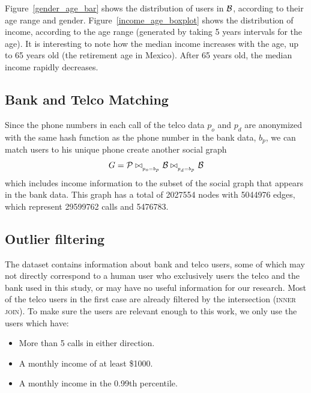 Figure~\ref{gender_age_bar} shows the distribution of users in $\mathcal{B}$, according to
their age range and gender.
Figure~\ref{income_age_boxplot} shows the distribution of income, according to the age range (generated by taking 5 years intervals for the age).
It is interesting to note how the median income increases with the age, up to 65 years old (the retirement age in Mexico). After 65 years old, the median income rapidly decreases.


\subsection{Bank and Telco Matching}

Since the phone numbers in each call of the telco data $ p_o $ and $ p_d $ are anonymized with the same hash function as the phone number in the bank data, $ b_p $, we can match users to his unique phone create another social graph 
$$ G = \mathcal{P} \bowtie_{_{p_o = b_p}} \mathcal{B} \bowtie_{_{p_d = b_p}} \mathcal{B} $$ 
which includes income information to the subset of the social graph that appears in the bank data.
This graph has a total of \num{2027554} nodes with \num{5044976} edges, which represent \num{29599762} calls and \num{5476783}.

\subsection{Outlier filtering}

The dataset contains information about bank and telco users, some of which may not directly correspond to a human user who exclusively users the telco and the bank used in this study, or may have no useful information for our research. Most of the telco users in the first case are already filtered by the intersection (\textsc{inner join}). To make sure the users are relevant enough to this work, we only use the users which have:

\begin{itemize}
	\item More than 5 calls in either direction.
	\item A monthly income of at least \$\num{1000}.
	\item A monthly income in the \num{0.99}th percentile.
\end{itemize}

